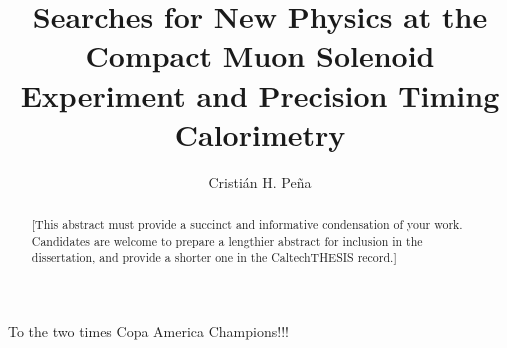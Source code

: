 \documentclass[14pt]{caltech_thesis}
\begin{document}
\title{Searches for New Physics at the Compact
Muon Solenoid Experiment and Precision Timing Calorimetry}
\author{Cristi\'an H. Pe\~na}

\address{Pasadena, California}                     %



\maketitle[logo]

\begin{acknowledgements} 	 
  To the two times Copa America Champions!!!
\end{acknowledgements}

\begin{abstract}
   [This abstract must provide a succinct and informative condensation of your work. Candidates are welcome to prepare a lengthier abstract for inclusion in the dissertation, and provide a shorter one in the CaltechTHESIS record.]
\end{abstract}

\begin{publishedcontent}%
\nocite{Cahn:etal:2015}
\end{publishedcontent}
\end{document}
